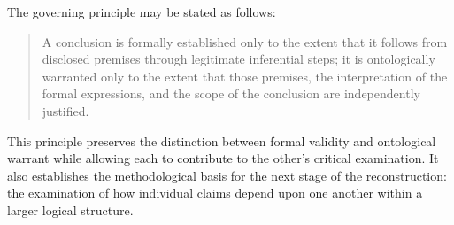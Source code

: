 The governing principle may be stated as follows:

\begin{quote}
A conclusion is formally established only to the extent that it
follows from disclosed premises through legitimate inferential
steps; it is ontologically warranted only to the extent that
those premises, the interpretation of the formal expressions,
and the scope of the conclusion are independently justified.
\end{quote}

This principle preserves the distinction between formal validity
and ontological warrant while allowing each to contribute to the
other's critical examination. It also establishes the methodological
basis for the next stage of the reconstruction: the examination
of how individual claims depend upon one another within a larger
logical structure.

